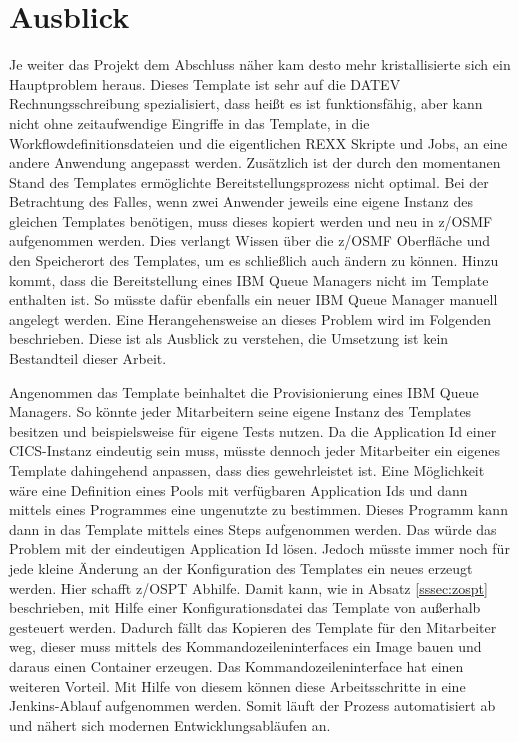 \chapter{Ausblick}\label{ch:ausblick}
Je weiter das Projekt dem Abschluss näher kam desto mehr kristallisierte sich ein Hauptproblem heraus.
Dieses Template ist sehr auf die DATEV Rechnungsschreibung spezialisiert, dass heißt es ist funktionsfähig, aber kann nicht ohne zeitaufwendige Eingriffe in das Template, in die Workflowdefinitionsdateien und die eigentlichen REXX Skripte und Jobs, an eine andere Anwendung angepasst werden.
Zusätzlich ist der durch den momentanen Stand des Templates ermöglichte Bereitstellungsprozess nicht optimal.
Bei der Betrachtung des Falles, wenn zwei Anwender jeweils eine eigene Instanz des gleichen Templates benötigen, muss dieses kopiert werden und neu in z/OSMF aufgenommen werden.
Dies verlangt Wissen über die z/OSMF Oberfläche und den Speicherort des Templates, um es schließlich auch ändern zu können.
Hinzu kommt, dass die Bereitstellung eines IBM Queue Managers nicht im Template enthalten ist.
So müsste dafür ebenfalls ein neuer IBM Queue Manager manuell angelegt werden.
Eine Herangehensweise an dieses Problem wird im Folgenden beschrieben.
Diese ist als Ausblick zu verstehen, die Umsetzung ist kein Bestandteil dieser Arbeit.

Angenommen das Template beinhaltet die Provisionierung eines IBM Queue Managers.
So könnte jeder Mitarbeitern seine eigene Instanz des Templates besitzen und beispielsweise für eigene Tests nutzen.
Da die Application Id einer CICS-Instanz eindeutig sein muss, müsste dennoch jeder Mitarbeiter ein eigenes Template dahingehend anpassen, dass dies gewehrleistet ist.
Eine Möglichkeit wäre eine Definition eines Pools mit verfügbaren Application Ids und dann mittels eines Programmes eine ungenutzte zu bestimmen.
Dieses Programm kann dann in das Template mittels eines Steps aufgenommen werden.
Das würde das Problem mit der eindeutigen Application Id lösen.
Jedoch müsste immer noch für jede kleine Änderung an der Konfiguration des Templates ein neues erzeugt werden.
Hier schafft z/OSPT Abhilfe.
Damit kann, wie in Absatz \ref{sssec:zospt} beschrieben, mit Hilfe einer Konfigurationsdatei das Template von außerhalb gesteuert werden.
Dadurch fällt das Kopieren des Template für den Mitarbeiter weg, dieser muss mittels des Kommandozeileninterfaces ein Image bauen und daraus einen Container erzeugen.
Das Kommandozeileninterface hat einen weiteren Vorteil.
Mit Hilfe von diesem können diese Arbeitsschritte in eine Jenkins-Ablauf aufgenommen werden.
Somit läuft der Prozess automatisiert ab und nähert sich modernen Entwicklungsabläufen an.

